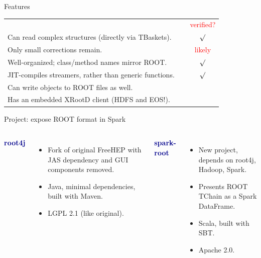 \documentclass{beamer}
\begin{document}
\begin{frame}{Features}
\renewcommand{\arraystretch}{1.5}
\begin{tabular}{p{0.85\linewidth} c}
& \textcolor{red}{verified?} \\
Can read complex structures (directly via TBaskets). & \textcolor{red}{$\surd$} \\
Only small corrections remain. & \textcolor{red}{likely} \\
Well-organized; class/method names mirror ROOT. & \textcolor{red}{$\surd$} \\
JIT-compiles streamers, rather than generic functions. & \textcolor{red}{$\surd$} \\
Can write objects to ROOT files as well. & \\
Has an embedded XRootD client (HDFS and EOS!). & \\
\end{tabular}
\end{frame}

\begin{frame}[fragile]{Project: expose ROOT format in Spark}
\vspace{0.5 cm}
\begin{columns}[t]
\textcolor{darkblue}{\large \bf root4j}

\vspace{0.1 cm}
\begin{itemize}
\item Fork of original FreeHEP with JAS dependency and GUI components removed.
\item Java, minimal dependencies, built with Maven.
\item LGPL 2.1 (like original).
\end{itemize}

\textcolor{darkblue}{\large \bf spark-root}

\vspace{0.1 cm}
\begin{itemize}
\item New project, depends on root4j, Hadoop, Spark.
\item Presents ROOT TChain as a Spark DataFrame.
\item Scala, built with SBT.
\item Apache 2.0.
\end{itemize}
\end{columns}
\end{frame}
\end{document}
